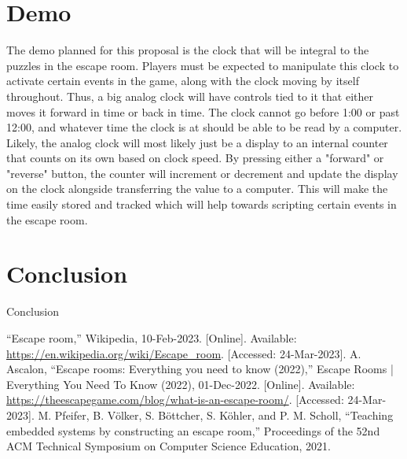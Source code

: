 \documentclass[conference]{IEEEtran}
\begin{document}
\section{Demo}
The demo planned for this proposal is the clock that will be integral to
the puzzles in the escape room. Players must be expected to manipulate
this clock to activate certain events in the game, along with the clock
moving by itself throughout. Thus, a big analog clock will have controls
tied to it that either moves it forward in time or back in time. The
clock cannot go before 1:00 or past 12:00, and whatever time the clock
is at should be able to be read by a computer.
\\
\indent Likely, the analog clock will most likely just be a display to an internal
counter that counts on its own based on clock speed. By pressing either a
"forward" or "reverse" button, the counter will increment or decrement
and update the display on the clock alongside transferring the value to
a computer. This will make the time easily stored and tracked which will
help towards scripting certain events in the escape room.

\section{Conclusion}
Conclusion

\begin{thebibliography}{00}

     “Escape room,” Wikipedia, 10-Feb-2023. [Online]. Available: \url{https://en.wikipedia.org/wiki/Escape_room}. [Accessed: 24-Mar-2023].
     A. Ascalon, “Escape rooms: Everything you need to know (2022),” Escape Rooms | Everything You Need To Know (2022), 01-Dec-2022. [Online]. Available:  \url{https://theescapegame.com/blog/what-is-an-escape-room/}. [Accessed: 24-Mar-2023].
     M. Pfeifer, B. Völker, S. Böttcher, S. Köhler, and P. M. Scholl, “Teaching embedded systems by constructing an escape room,” Proceedings of the 52nd ACM Technical Symposium on Computer Science Education, 2021.

\end{thebibliography}
\end{document}
